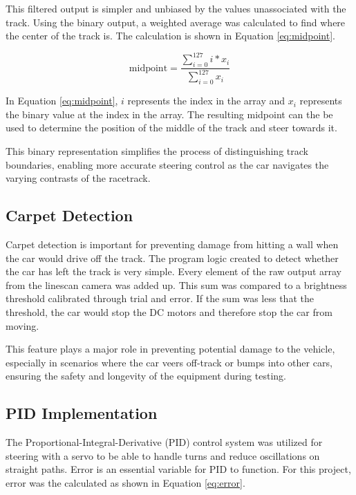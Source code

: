 \documentclass[conference]{IEEEtran}
\begin{document}
This filtered output is simpler and unbiased by the values unassociated with the track. Using the binary output, a weighted average was calculated to find where the center of the track is. The calculation is shown in Equation \ref{eq:midpoint}.

\begin{equation}
	\text{midpoint} = \frac{\sum_{i=0}^{127} i*x_i}{\sum_{i=0}^{127} x_i}\label{eq:midpoint}
\end{equation}

In Equation \ref{eq:midpoint}, $i$ represents the index in the array and $x_i$ represents the binary value at the index in the array. The resulting midpoint can the be used to determine the position of the middle of the track and steer towards it.

This binary representation simplifies the process of distinguishing track boundaries, enabling more accurate steering control as the car navigates the varying contrasts of the racetrack.

\subsection{Carpet Detection}

Carpet detection is important for preventing damage from hitting a wall when the car would drive off the track. The program logic created to detect whether the car has left the track is very simple. Every element of the raw output array from the linescan camera was added up. This sum was compared to a brightness threshold calibrated through trial and error. If the sum was less that the threshold, the car would stop the DC motors and therefore stop the car from moving.

This feature plays a major role in preventing potential damage to the vehicle, especially in scenarios where the car veers off-track or bumps into other cars, ensuring the safety and longevity of the equipment during testing.

\subsection{PID Implementation}


The Proportional-Integral-Derivative (PID) control system was utilized for steering with a servo to be able to handle turns and reduce oscillations on straight paths. Error is an essential variable for PID to function. For this project, error was the calculated as shown in Equation \ref{eq:error}.
\end{document}
